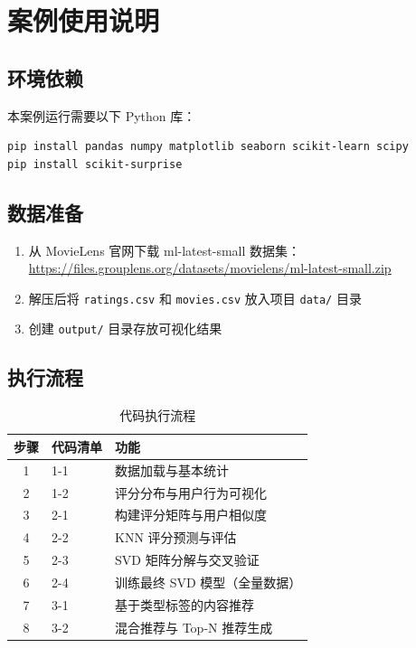 \documentclass[12pt,a4paper]{ctexart}
\begin{document}
\section{案例使用说明}

\subsection{环境依赖}

本案例运行需要以下 Python 库：

{\footnotesize
\begin{verbatim}
pip install pandas numpy matplotlib seaborn scikit-learn scipy
pip install scikit-surprise
\end{verbatim}
}

\subsection{数据准备}

\begin{enumerate}[label=步骤 \arabic*:, leftmargin=*]
    \item 从 MovieLens 官网下载 ml-latest-small 数据集：\url{https://files.grouplens.org/datasets/movielens/ml-latest-small.zip}
    \item 解压后将 \texttt{ratings.csv} 和 \texttt{movies.csv} 放入项目 \texttt{data/} 目录
    \item 创建 \texttt{output/} 目录存放可视化结果
\end{enumerate}

\subsection{执行流程}

\begin{table}[H]
\centering
\caption{代码执行流程}
\label{tab:flow}
\small
\begin{tabular}{cll}
\toprule
\textbf{步骤} & \textbf{代码清单} & \textbf{功能} \\
\midrule
1 & 1-1 & 数据加载与基本统计 \\
2 & 1-2 & 评分分布与用户行为可视化 \\
3 & 2-1 & 构建评分矩阵与用户相似度 \\
4 & 2-2 & KNN 评分预测与评估 \\
5 & 2-3 & SVD 矩阵分解与交叉验证 \\
6 & 2-4 & 训练最终 SVD 模型（全量数据） \\
7 & 3-1 & 基于类型标签的内容推荐 \\
8 & 3-2 & 混合推荐与 Top-N 推荐生成 \\
\bottomrule
\end{tabular}
\end{table}
\end{document}
